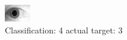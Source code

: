 \begin{figure}[h!]
\begin{center}
\includegraphics[width=0.60\columnwidth]{figures/ID1927_class_4_target_3.png}
\end{center}
\caption{ Classification: 4 actual target: 3}
\label{fig:ID1927_class_4_target_3}
\end{figure}
